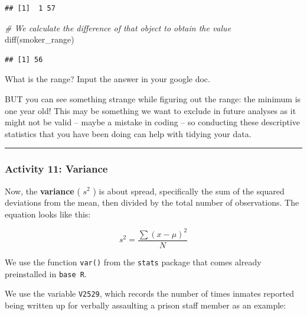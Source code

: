\documentclass[
]{book}
\newenvironment{Shaded}{\begin{snugshade}}{\end{snugshade}}
\newcommand{\CommentTok}[1]{\textcolor[rgb]{0.56,0.35,0.01}{\textit{#1}}}
\newcommand{\FunctionTok}[1]{\textcolor[rgb]{0.00,0.00,0.00}{#1}}
\newcommand{\NormalTok}[1]{#1}
\newcommand{\SpecialCharTok}[1]{\textcolor[rgb]{0.00,0.00,0.00}{#1}}
\begin{document}
\begin{verbatim}
## [1]  1 57
\end{verbatim}

\begin{Shaded}
\begin{Highlighting}[]
\CommentTok{\# We calculate the difference of that object to obtain the value}
\FunctionTok{diff}\NormalTok{(smoker\_range)}
\end{Highlighting}
\end{Shaded}

\begin{verbatim}
## [1] 56
\end{verbatim}

What is the range? Input the answer in your google doc.

BUT you can see something strange while figuring out the range: the minimum is one year old! This may be something we want to exclude in future analyses as it might not be valid -- maybe a mistake in coding -- so conducting these descriptive statistics that you have been doing can help with tidying your data.

\begin{center}\rule{0.5\linewidth}{0.5pt}\end{center}

\hypertarget{activity-11-variance}{%
\subsubsection{Activity 11: Variance}\label{activity-11-variance}}

Now, the \textbf{variance} ( \(s^2\) ) is about spread, specifically the sum of the squared deviations from the mean, then divided by the total number of observations. The equation looks like this:

\[ s^2 = \frac{\sum(x - \mu)^2}{N}\]

We use the function \texttt{var()} from the \texttt{stats} package that comes already preinstalled in \texttt{base\ R}.

We use the variable \texttt{V2529}, which records the number of times inmates reported being written up for verbally assaulting a prison staff member as an example:

\begin{Shaded}
\end{Shaded}
\end{document}
